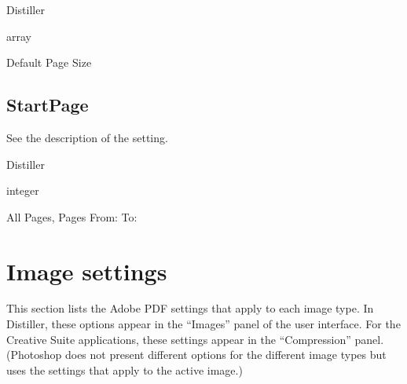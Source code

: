 \documentclass[letterpaper,12pt,english,openany,oneside]{sphinxmanual}
\begin{document}
Distiller

\label{\detokenize{PDF_Create_CommonSettings:type-15}}

array

\label{\detokenize{PDF_Create_CommonSettings:ui-name-11}}

Default Page Size

\label{\detokenize{PDF_Create_CommonSettings:default-value-12}}

\begin{sphinxVerbatim}[commandchars=\\\{\}]
\PYG{p}{[} \PYG{p}{]}
\end{sphinxVerbatim}




\subsection{StartPage}
\label{\detokenize{PDF_Create_CommonSettings:startpage}}
See the description of the  setting.

\label{\detokenize{PDF_Create_CommonSettings:supported-by-16}}

Distiller

\label{\detokenize{PDF_Create_CommonSettings:type-16}}

integer

\label{\detokenize{PDF_Create_CommonSettings:ui-name-12}}

All Pages, Pages From: To:

\label{\detokenize{PDF_Create_CommonSettings:default-value-13}}

\begin{sphinxVerbatim}[commandchars=\\\{\}]
\end{sphinxVerbatim}




\section{Image settings}
\label{\detokenize{PDF_Create_CommonSettings:image-settings}}
This section lists the Adobe PDF settings that apply to each image type. In Distiller, these options appear in the “Images” panel of the user interface. For the Creative Suite applications, these settings appear in the “Compression” panel. (Photoshop does not present different options for the different image types but uses the settings that apply to the active image.)
\end{document}
